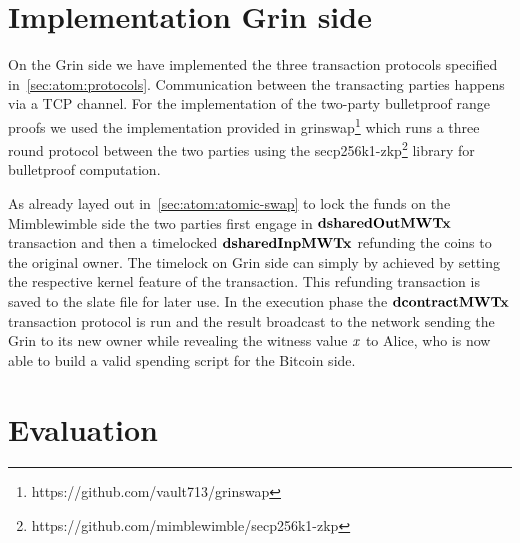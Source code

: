 \section{Implementation Grin side}\label{sec:ImplementationGrin}

On the Grin side we have implemented the three transaction protocols specified in~\cref{sec:atom:protocols}.
Communication between the transacting parties happens via a TCP channel.
For the implementation of the two-party bulletproof range proofs we used the implementation provided in grinswap\footnote{https://github.com/vault713/grinswap} which runs a three round protocol between the two parties using the secp256k1-zkp\footnote{https://github.com/mimblewimble/secp256k1-zkp} library for bulletproof computation.

As already layed out in~\cref{sec:atom:atomic-swap} to lock the funds on the Mimblewimble side the two parties first engage in $\mathbf{dsharedOutMWTx}$ transaction and then a timelocked $\mathbf{dsharedInpMWTx}$ refunding the coins to the original owner.
The timelock on Grin side can simply by achieved by setting the respective kernel feature of the transaction.
This refunding transaction is saved to the slate file for later use.
In the execution phase the $\mathbf{dcontractMWTx}$ transaction protocol is run and the result broadcast to the network sending the Grin to its new owner while revealing the witness value $\mathit{x}$ to Alice, who is now able to build a valid spending script for the Bitcoin side.

\section{Evaluation}

